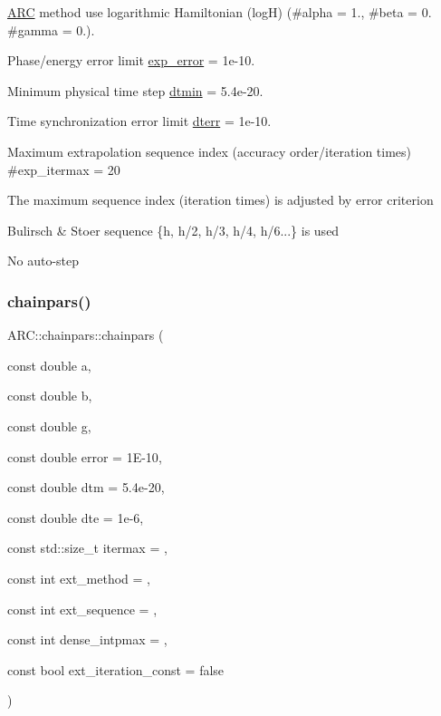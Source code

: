 \begin{DoxyItemize}
\item \hyperlink{namespaceARC}{A\+RC} method use logarithmic Hamiltonian (logH) (\#alpha = 1., \#beta = 0. \#gamma = 0.).
\item Phase/energy error limit \hyperlink{classARC_1_1chainpars_a7ee477ebe8b1d67457891ab58560c074}{exp\+\_\+error} = 1e-\/10.
\item Minimum physical time step \hyperlink{classARC_1_1chainpars_ac414014d19915aecb35245ba11649c2e}{dtmin} = 5.\+4e-\/20.
\item Time synchronization error limit \hyperlink{classARC_1_1chainpars_ad3a3e8f9199180ec82b9c257b1e8570e}{dterr} = 1e-\/10.
\item Maximum extrapolation sequence index (accuracy order/iteration times) \#exp\+\_\+itermax = 20
\item The maximum sequence index (iteration times) is adjusted by error criterion
\item Bulirsch \& Stoer sequence \{h, h/2, h/3, h/4, h/6...\} is used
\item No auto-\/step 
\end{DoxyItemize}\hypertarget{classARC_1_1chainpars_a26235d742aafa97dcaad75a5db74141e}{}\label{classARC_1_1chainpars_a26235d742aafa97dcaad75a5db74141e} 
\subsubsection{\texorpdfstring{chainpars()}{chainpars()}\hspace{0.1cm}{\footnotesize\ttfamily [2/2]}}
{\footnotesize\ttfamily A\+R\+C\+::chainpars\+::chainpars (\begin{DoxyParamCaption}\item[{const double}]{a,  }\item[{const double}]{b,  }\item[{const double}]{g,  }\item[{const double}]{error = {\ttfamily 1E-\/10},  }\item[{const double}]{dtm = {\ttfamily 5.4e-\/20},  }\item[{const double}]{dte = {\ttfamily 1e-\/6},  }\item[{const std\+::size\+\_\+t}]{itermax = {},  }\item[{const int}]{ext\+\_\+method = {},  }\item[{const int}]{ext\+\_\+sequence = {},  }\item[{const int}]{dense\+\_\+intpmax = {},  }\item[{const bool}]{ext\+\_\+iteration\+\_\+const = {\ttfamily false} }\end{DoxyParamCaption})\hspace{0.3cm}{\ttfamily [inline]}}



